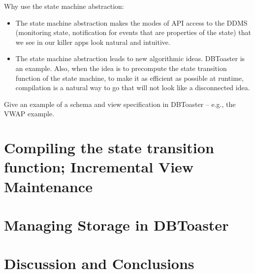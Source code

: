 \documentclass{sig-alternate}
\begin{document}
Why use the state machine abstraction:
\begin{itemize}
\item
The state machine abstraction makes the modes of API access to the DDMS (monitoring state, notification for events that are properties of the state) that we see in our killer apps look natural and intuitive.

\item
The state machine abstraction leads to new algorithmic ideas. DBToaster is an example. Also, when the idea is to precompute the state transition function of the state machine, to make it as efficient as possible at runtime, compilation is a natural way to go that will not look like a disconnected idea.
\end{itemize}

Give an example of a schema and view specification in DBToaster -- e.g., the VWAP example.





\section{Compiling the state transition function; Incremental View Maintenance}




\section{Managing Storage in DBToaster}



\section{Discussion and Conclusions}
\end{document}
